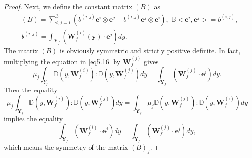 \documentclass{article}
\theoremstyle{plain}
\theoremstyle{definition}
\numberwithin{equation}{section}
\begin{document}
\begin{proof}
Next, we define the constant matrix $(B)$ as
\begin{equation}\label{eq5.16}
\begin{aligned}
& 
(B)=\sum_{i,j=1}^{3}({b}^{(i,j)}\boldsymbol{e}^{i}\otimes\boldsymbol{e}^{j}+
{b}^{(i,j)}\boldsymbol{e}^{j}\otimes\boldsymbol{e}^{i}),\,\,
\mathbb{B}<\boldsymbol{e}^{i},\boldsymbol{e}^{j}>={b}^{(i,j)},
\\
& {b}^{(i,j)}=
\int_{\textbf{Y}_{f}}(\boldsymbol{W}_{f}^{(i)}(\boldsymbol{y})\cdot\boldsymbol{e}^{j})dy.
\end{aligned}
\end{equation}
The matrix $(B)$ is obviously symmetric and strictly positive definite.
In fact, multiplying the equation in \eqref{eq5.16} by $\boldsymbol{W}_{f}^{(j)}$ gives
\begin{equation*}
\mu_{j}\int_{{Y}_{f}}\mathbb{D}(y,\boldsymbol{W}_{f}^{(i)}):
\mathbb{D}(y,\boldsymbol{W}_{f}^{(j)})dy=
\int_{\textbf{Y}_{f}}(\boldsymbol{W}_{f}^{(j)}\cdot\boldsymbol{e}^{i})dy.
\end{equation*}
Then the equality
\begin{equation*}
\mu_{j}\int_{\textbf{Y}_{f}}\mathbb{D}(y,\boldsymbol{W}_{f}^{(i)}):
\mathbb{D}(y,\boldsymbol{W}_{f}^{(j)})dy=
\int_{\textbf{Y}_{f}}\mu_{j}\mathbb{D}(y,\boldsymbol{W}_{f}^{(j)}):
\mathbb{D}(y,\boldsymbol{W}_{f}^{(i)})dy
\end{equation*}
implies the equality
\begin{equation}\label{eq5.17}
\int_{\textbf{Y}_{f}}(\boldsymbol{W}_{f}^{(i)}\cdot\boldsymbol{e}^{j})dy=
\int_{\textbf{Y}_{f}}(\boldsymbol{W}_{f}^{(j)}\cdot\boldsymbol{e}^{i})dy,
\end{equation}
which means the symmetry of the matrix $(B)_{f}$.


\end{proof}
\end{document}
